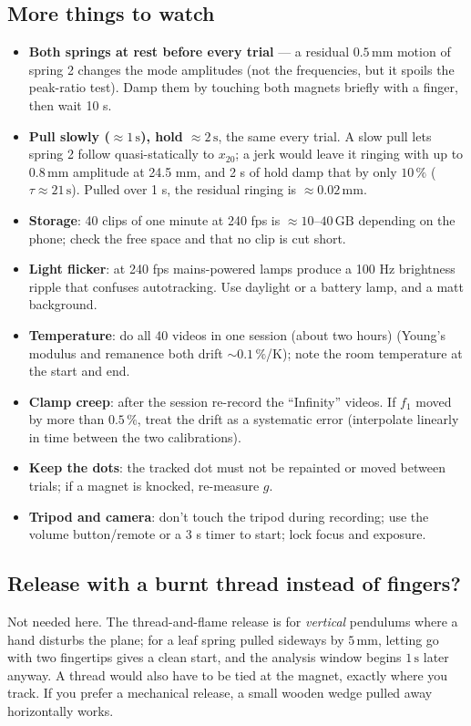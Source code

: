 \documentclass[11pt,a4paper]{article}
\newcommand{\un}[1]{\,\mathrm{#1}}
\begin{document}
\subsection*{More things to watch}
\begin{itemize}[leftmargin=1.6em,itemsep=1pt]
\item \textbf{Both springs at rest before every trial} --- a residual $0.5\un{mm}$ motion of spring 2 changes the mode amplitudes (not the frequencies, but it spoils the peak-ratio test). Damp them by touching both magnets briefly with a finger, then wait 10 s.
\item \textbf{Pull slowly ($\approx1\un{s}$), hold $\approx2\un{s}$}, the same every trial. A slow pull lets spring 2 follow quasi-statically to $x_{20}$; a jerk would leave it ringing with up to $0.8\un{mm}$ amplitude at 24.5 mm, and 2 s of hold damp that by only $10\,\%$ ($\tau\approx21\un{s}$). Pulled over 1 s, the residual ringing is $\approx0.02\un{mm}$.
\item \textbf{Storage}: 40 clips of one minute at 240 fps is $\approx10$--$40\un{GB}$ depending on the phone; check the free space and that no clip is cut short.
\item \textbf{Light flicker}: at 240 fps mains-powered lamps produce a 100 Hz brightness ripple that confuses autotracking. Use daylight or a battery lamp, and a matt background.
\item \textbf{Temperature}: do all 40 videos in one session (about two hours) (Young's modulus and remanence both drift $\sim0.1\,\%$/K); note the room temperature at the start and end.
\item \textbf{Clamp creep}: after the session re-record the ``Infinity'' videos. If $f_1$ moved by more than $0.5\,\%$, treat the drift as a systematic error (interpolate linearly in time between the two calibrations).
\item \textbf{Keep the dots}: the tracked dot must not be repainted or moved between trials; if a magnet is knocked, re-measure $g$.
\item \textbf{Tripod and camera}: don't touch the tripod during recording; use the volume button/remote or a 3 s timer to start; lock focus and exposure.
\end{itemize}

\subsection*{Release with a burnt thread instead of fingers?}
Not needed here. The thread-and-flame release is for \emph{vertical} pendulums where a hand disturbs the plane; for a leaf spring pulled sideways by $5\un{mm}$, letting go with two fingertips gives a clean start, and the analysis window begins $1\un{s}$ later anyway. A thread would also have to be tied at the magnet, exactly where you track. If you prefer a mechanical release, a small wooden wedge pulled away horizontally works.
\end{document}

